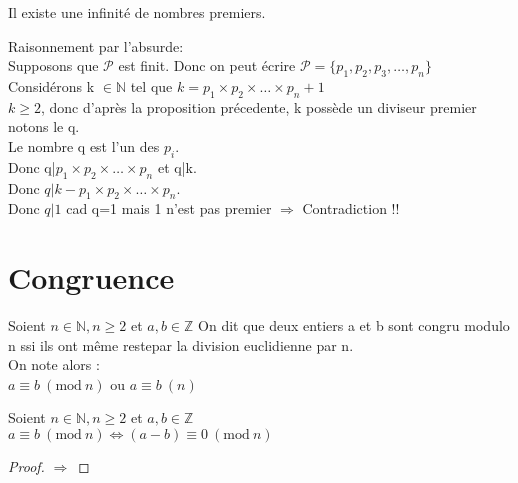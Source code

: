 \begin{matheo}
Il existe une infinit\'e de nombres premiers.
\end{matheo}

\begin{myproof}[Demonstration :]
Raisonnement par l'absurde: \\
Supposons que $\mathcal{P}$ est finit. Donc on peut \'ecrire $\mathcal{P} = \{p_1, p_2, p_3, \ldots , p_n\}$ \\
Consid\'erons k $\in \mathbb{N}$ tel que $k=p_1 \times p_2 \times \ldots \times p_n + 1 $ \\
$k \ge 2$, donc d'apr\`es la proposition pr\'ecedente, k poss\`ede un diviseur premier notons le q. \\
Le nombre q est l'un des $p_i$.\\
 Donc q|$p_1 \times p_2 \times \ldots \times p_n$ et q|k.\\
 Donc $q|k- p_1 \times p_2 \times \ldots \times p_n$. \\
 Donc $q|1$ cad q=1 mais 1 n'est pas premier $\Rightarrow$ Contradiction !!


\end{myproof}




\section{Congruence}
\begin{madef}
Soient $n \in \mathbb{N}, n \ge 2$ et $a, b \in \mathbb{Z}$ 
On dit que deux entiers a et b sont congru modulo n ssi ils ont m\^eme restepar la division euclidienne par n. \\
On note alors : \\
$a \equiv b\ (\textrm{mod}\ n)$ ou $a \equiv b\ (n)$
\end{madef}

\begin{matheo}
Soient $n \in \mathbb{N}, n \ge 2$ et $a, b \in \mathbb{Z}$ \\ 
$a \equiv b\ (\textrm{mod}\ n) \Leftrightarrow (a-b) \equiv 0\ (\textrm{mod}\ n)$

\end{matheo}
\begin{proof} $\Rightarrow$

\end{proof}


